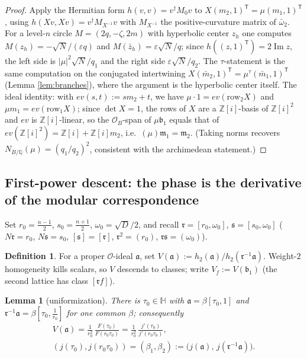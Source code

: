 \documentclass[11pt]{amsart}
\numberwithin{equation}{section}
\theoremstyle{plain}
\newtheorem{lemma}[theorem]{Lemma}
\theoremstyle{definition}
\newtheorem{definition}[theorem]{Definition}
\theoremstyle{remark}
\newcommand{\Q}{\mathbb{Q}}
\newcommand{\Z}{\mathbb{Z}}
\newcommand{\HH}{\mathbb{H}}
\newcommand{\Zi}{\Z[i]}
\newcommand{\im}{\operatorname{Im}}
\newcommand{\ideala}{\mathfrak{a}}
\newcommand{\idealb}{\mathfrak{b}}
\newcommand{\idealm}{\mathfrak{m}}
\newcommand{\idealr}{\mathfrak{r}}
\newcommand{\ideals}{\mathfrak{s}}
\newcommand{\lat}[1]{\left[#1\right]}
\begin{document}
\begin{proof}
Apply the Hermitian form $h(v, v) = v^{\dagger}M_0v$ to
$X(m_2, 1)^{\mathsf T} = \mu(m_1, 1)^{\mathsf T}$, using
$h(Xv, Xv) = v^{\dagger}M_{X^{-1}}v$ with $M_{X^{-1}}$ the
positive-curvature matrix of $\bar\omega_2$.  For a level-$n$ circle
$M = (2q, -\zeta, 2m)$ with hyperbolic center $z_h$ one computes
$M(z_h) = -\sqrt N/(\varepsilon q)$ and $M(\bar z_h) = \varepsilon\sqrt
N/q$; since $h((z, 1)^{\mathsf T}) = 2\im z$, the left side is
$|\mu|^2\sqrt N/q_1$ and the right side $\varepsilon\sqrt N/q_2$.  The
$\tau$-statement is the same computation on the conjugated intertwining
$X(\bar m_2, 1)^{\mathsf T} = \mu^{\tau}(\bar m_1, 1)^{\mathsf T}$
(Lemma \ref{lem:branches}), where the argument is the hyperbolic
center itself.  The ideal identity: with $ev(s, t) := sm_2 + t$, we
have $\mu\cdot 1 = ev(\mathrm{row}_2 X)$ and $\mu m_1 =
ev(\mathrm{row}_1 X)$; since $\det X = 1$, the rows of $X$ are a
$\Zi$-basis of $\Zi^2$ and $ev$ is $\Zi$-linear, so the
$\mathcal{O}_B$-span of $\mu\idealb_1$ equals that of
$ev(\Zi^2) = \Zi + \Zi m_2$, i.e.\ $(\mu)\idealm_1 = \idealm_2$.
(Taking norms recovers $N_{B/\Q}(\mu) = (q_1/q_2)^2$, consistent with
the archimedean statement.)
\end{proof}

\subsection{First-power descent: the phase is the derivative of the
modular correspondence}\label{subsec:firstpower}

Set $r_0 = \tfrac{n-1}{2}$, $s_0 = \tfrac{n+1}{2}$,
$\omega_0 = \sqrt D/2$, and recall
$\idealr = \lat{r_0, \omega_0}$, $\ideals = \lat{s_0, \omega_0}$
($N\idealr = r_0$, $N\ideals = s_0$, $[\ideals] = [\idealr]$,
$\idealr^2 = (r_0)$, $\idealr\ideals = (\omega_0)$).

\begin{definition}
For a proper $\mathcal{O}$-ideal $\ideala$, set
$V(\ideala) := h_2(\ideala)/h_2(\idealr^{-1}\ideala)$.  Weight-$2$
homogeneity kills scalars, so $V$ descends to classes; write
$V_f := V(\idealb_1)$ (the second lattice has class $[\idealr f]$).
\end{definition}

\begin{lemma}[uniformization]\label{lem:uniformization}
There is $\tau_0 \in \HH$ with $\ideala = \beta\lat{\tau_0, 1}$ and
$\idealr^{-1}\ideala = \beta\lat{\tau_0, \tfrac{1}{r_0}}$ for one
common $\beta$; consequently
\begin{gather*}
  V(\ideala) = \frac{1}{r_0^2}\,\frac{F(\tau_0)}{F(r_0\tau_0)}
  = \frac{1}{r_0^2}\,\frac{j'(\tau_0)}{j'(r_0\tau_0)},\\
  (j(\tau_0), j(r_0\tau_0)) = (\beta_1, \beta_2)
  := \bigl(j(\ideala),\, j(\idealr^{-1}\ideala)\bigr).
\end{gather*}
\end{lemma}
\end{document}
